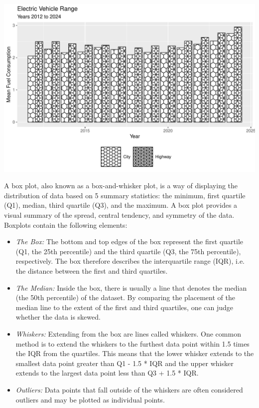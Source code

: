 \begin{center}
  \includegraphics[width=.8\textwidth]{fuel.columnsPatterns.pdf}
\end{center}

A box plot, also known as a box-and-whisker plot, is a way of displaying the distribution of data based on 5 summary statistics: the minimum, first quartile (Q1), median, third quartile (Q3), and the maximum. A box plot provides a visual summary of the spread, central tendency, and symmetry of the data. Boxplots contain the following elements:

\begin{itemize}
\item \emph{The Box:} The bottom and top edges of the box represent the first quartile (Q1, the 25th percentile) and the third quartile (Q3, the 75th percentile), respectively. The box therefore describes the interquartile range (IQR), i.e. the distance between the first and third quartiles.
\item \emph{The Median:} Inside the box, there is usually a line that denotes the median (the 50th percentile) of the dataset. By comparing the placement of the median line to the extent of the first and third quartiles, one can judge whether the data is skewed.
\item \emph{Whiskers:} Extending from the box are lines called whiskers. One common method is to extend the whiskers to the furthest data point within 1.5 times the IQR from the quartiles. This means that the lower whisker extends to the smallest data point greater than Q1 - 1.5 * IQR and the upper whisker extends to the largest data point less than Q3 + 1.5 * IQR.
\item \emph{Outliers:} Data points that fall outside of the whiskers are often considered outliers and may be plotted as individual points.
\end{itemize}

